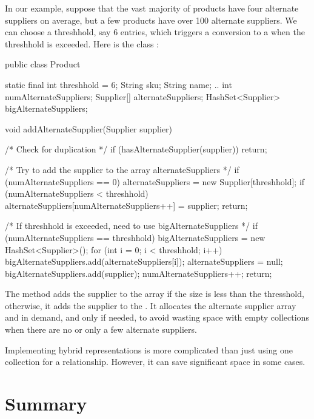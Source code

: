 In our example, suppose that the vast majority of products have four alternate
suppliers on average, but a few products have over 100 alternate suppliers. We
can choose a threshhold, say 6 entries, which triggers a conversion to a
 when the threshhold is exceeded. Here is the class
:

\begin{shortlisting} 
public class Product {

	    static final int threshhold = 6;
		String sku;
		String name;
		..
		int numAlternateSuppliers;
		Supplier[] alternateSuppliers;
		HashSet<Supplier> bigAlternateSuppliers;
		
		void addAlternateSupplier(Supplier supplier) {
		
		    /* Check for duplication */
		    if (hasAlternateSupplier(supplier)) {
		         return;
		    }
		
		    /* Try to add the supplier to the array alternateSuppliers */
		    if (numAlternateSuppliers == 0) {
		        alternateSuppliers = new Supplier[threshhold];
		    }
			if (numAlternateSuppliers < threshhold) {
			    alternateSuppliers[numAlternateSuppliers++] = supplier;
			    return;
			}
			
			/* If threshhold is exceeded, need to use bigAlternateSuppliers */
			if (numAlternateSuppliers == threshhold) {
			    bigAlternateSuppliers = new HashSet<Supplier>();
			    for (int i = 0; i < threshhold; i++) {
			    	bigAlternateSuppliers.add(alternateSuppliers[i]);
			    }
			    alternateSuppliers = null;
			}
			bigAlternateSuppliers.add(supplier);
			numAlternateSuppliers++;
			return;
		}
}
\end{shortlisting}
The method  adds the supplier to the array if the size is less
than the thresshold, otherwise, it adds the supplier to the .
It allocates the alternate supplier array and  in demand, and
only if needed, to avoid wasting space with empty collections when there are no
or only a few alternate suppliers.

Implementing hybrid representations is more complicated than just using one
collection for a relationship. However, it can save significant space in some
cases.

\section{Summary}

